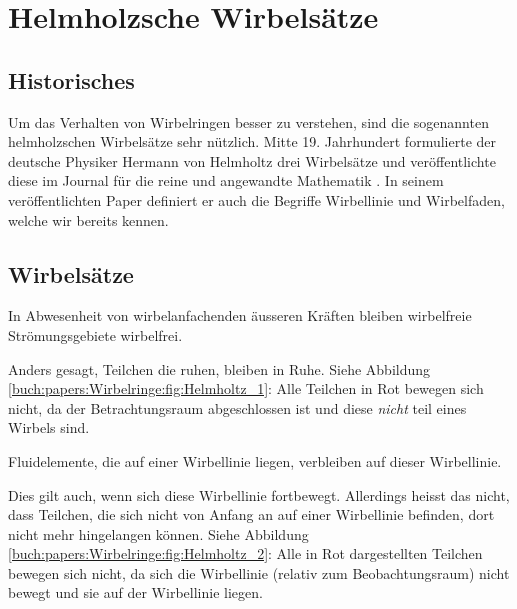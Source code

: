 %
%
%
\section{Helmholzsche Wirbelsätze}

\subsection{Historisches}

Um das Verhalten von Wirbelringen besser zu verstehen, sind die sogenannten helmholzschen Wirbelsätze sehr nützlich. 
Mitte 19. Jahrhundert formulierte der deutsche Physiker Hermann von Helmholtz drei Wirbelsätze und veröffentlichte diese im Journal für die reine und angewandte Mathematik \cite{Wirbelringe:JournalHelmholz}.
In seinem veröffentlichten Paper definiert er auch die Begriffe Wirbellinie und Wirbelfaden, welche wir bereits kennen.

\subsection{Wirbelsätze}



\begin{satz}
    \label{buch:wirbelringe:satz:wirbelsatz1}
    In Abwesenheit von wirbelanfachenden äusseren Kräften bleiben wirbelfreie Strömungsgebiete wirbelfrei.
\end{satz}

Anders gesagt, Teilchen die ruhen, bleiben in Ruhe. 
Siehe Abbildung \ref{buch:papers:Wirbelringe:fig:Helmholtz_1}: 
Alle Teilchen in Rot bewegen sich nicht, da der Betrachtungsraum abgeschlossen ist und diese {\em nicht} teil eines Wirbels sind.

\begin{satz}
    \label{buch:wirbelringe:satz:wirbelsatz2}
    Fluidelemente, die auf einer Wirbellinie liegen, verbleiben auf dieser Wirbellinie.
\end{satz}

Dies gilt auch, wenn sich diese Wirbellinie fortbewegt.
Allerdings heisst das nicht, dass Teilchen, die sich nicht von Anfang an auf einer Wirbellinie befinden, dort nicht mehr hingelangen können.
Siehe Abbildung \ref{buch:papers:Wirbelringe:fig:Helmholtz_2}:
Alle in Rot dargestellten Teilchen bewegen sich nicht, da sich die Wirbellinie (relativ zum Beobachtungsraum) nicht bewegt und sie auf der Wirbellinie liegen.

